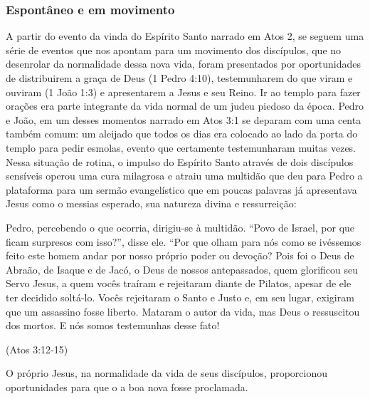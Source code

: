 \documentclass[
	12pt,				%
	openright,			%
	twoside,			%
	a4paper,			%
	english,			%
	french,				%
	spanish,			%
	brazil				%
	]{abntex2}
\begin{document}

\subsubsection{Espontâneo e em movimento}

A partir do evento da vinda do Espírito Santo narrado em Atos 2, se seguem uma série de eventos que nos apontam para um movimento dos discípulos, que no desenrolar da normalidade dessa nova vida, foram presentados por oportunidades de distribuirem a graça de Deus (1 Pedro 4:10), testemunharem do que viram e ouviram (1 João 1:3) e apresentarem a Jesus e seu Reino. Ir ao templo para fazer orações era parte integrante da vida normal de um judeu piedoso da época. Pedro e João, em um desses momentos narrado em Atos 3:1 se deparam com uma centa também comum: um aleijado que todos os dias era colocado ao lado da porta do templo para pedir esmolas, evento que certamente testemunharam muitas vezes. Nessa situação de rotina, o impulso do Espírito Santo através de dois discípulos sensíveis operou uma cura milagrosa e atraiu uma multidão que deu para Pedro a plataforma para um sermão evangelístico que em poucas palavras já apresentava Jesus como o messias esperado, sua natureza divina e ressurreição:

\begin{citacao}
	Pedro, percebendo o que ocorria, dirigiu-se à multidão. “Povo de Israel, por que ficam surpresos com isso?”, disse ele. “Por que olham para nós como se ivéssemos feito este homem andar por nosso próprio poder ou devoção? Pois foi o Deus de Abraão, de Isaque e de Jacó, o Deus de nossos antepassados, quem glorificou seu Servo Jesus, a quem vocês traíram e rejeitaram diante de Pilatos,
	apesar de ele ter decidido soltá-lo. Vocês rejeitaram o Santo e Justo e, em seu lugar, exigiram que um assassino fosse liberto. Mataram o autor da vida, mas Deus o ressuscitou dos mortos. E nós somos testemunhas desse fato!
\end{citacao}(Atos 3:12-15)

O próprio Jesus, na normalidade da vida de seus discípulos, proporcionou oportunidades para que o a boa nova fosse proclamada. 
\end{document}
